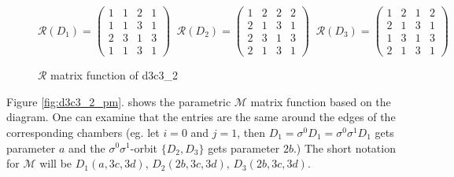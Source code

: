 \documentclass[12pt,a4paper]{article}
\numberwithin{equation}{section}
\theoremstyle{plain}%
\theoremstyle{definition}
\theoremstyle{remark}
\begin{document}
\begin{figure}
  \caption{\label{fig:d3c3_2_r} $\mathcal{R}$ matrix function of d3c3\_2}
  \begin{equation*}
    \mathcal{R}(D_1)=
    \left(
    \begin{array}{cccc}
      1 & 1 & 2 & 1\\
      1 & 1 & 3 & 1\\
      2 & 3 & 1 & 3\\
      1 & 1 & 3 & 1
    \end{array}
    \right)\;\;
    \mathcal{R}(D_2)=
    \left(
    \begin{array}{cccc}
      1 & 2 & 2 & 2\\
      2 & 1 & 3 & 1\\
      2 & 3 & 1 & 3\\
      2 & 1 & 3 & 1
    \end{array}
    \right)\;\;
    \mathcal{R}(D_3)=
    \left(
    \begin{array}{cccc}
      1 & 2 & 1 & 2\\
      2 & 1 & 3 & 1\\
      1 & 3 & 1 & 3\\
      2 & 1 & 3 & 1
    \end{array}
    \right)
  \end{equation*}
\end{figure}

Figure \ref{fig:d3c3_2_pm}. shows the parametric $\mathcal{M}$ matrix function
based on the diagram. One can examine that the entries are the same around the
edges of the corresponding chambers (eg. let $i=0$ and $j=1$, then
$D_1=\sigma^0D_1=\sigma^0\sigma^1D_1$ gets parameter $a$ and the
$\sigma^0\sigma^1$-orbit $\{D_2,D_3\}$ gets parameter $2b$.) The short notation
for $\mathcal{M}$ will be $D_1(a,3c,3d)$, $D_2(2b,3c,3d)$, $D_3(2b,3c,3d)$. 
\end{document}
